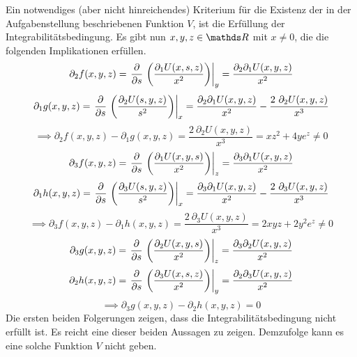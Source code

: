 \begin{atiSolution}
\begin{atiSubtaskSolutions}
{\[      \]
      Ein notwendiges (aber nicht hinreichendes) Kriterium für die Existenz der in der Aufgabenstellung beschriebenen Funktion $V$, ist die Erfüllung der Integrabilitätsbedingung.
      Es gibt nun $x,y,z\in\setReal$ mit $x\neq 0$, die die folgenden Implikationen erfüllen.
      \[
        \partial_2f(x,y,z) = \leibnizPartialDerivativeOperatorValue{s}{\roundBrackets{\frac{\partial_1U(x,s,z)}{x^2}}}{y} = \frac{\partial_2\partial_1U(x,y,z)}{x^2}
      \]
      \[
        \partial_1g(x,y,z) = \leibnizPartialDerivativeOperatorValue{s}{\roundBrackets{\frac{\partial_2U(s,y,z)}{s^2}}}{x} = \frac{\partial_2\partial_1U(x,y,z)}{x^2} - \frac{2\ \partial_2U(x,y,z)}{x^3}
      \]
      \[
        \implies \partial_2f(x,y,z) - \partial_1g(x,y,z) = \frac{2\ \partial_2U(x,y,z)}{x^3} = xz^2 + 4ye^z \neq 0
      \]
      \[
        \partial_3f(x,y,z) = \leibnizPartialDerivativeOperatorValue{s}{\roundBrackets{\frac{\partial_1U(x,y,s)}{x^2}}}{z} = \frac{\partial_3\partial_1U(x,y,z)}{x^2}
      \]
      \[
        \partial_1h(x,y,z) = \leibnizPartialDerivativeOperatorValue{s}{\roundBrackets{\frac{\partial_3U(s,y,z)}{s^2}}}{x} = \frac{\partial_3\partial_1U(x,y,z)}{x^2} - \frac{2\ \partial_3U(x,y,z)}{x^3}
      \]
      \[
        \implies \partial_3f(x,y,z) - \partial_1h(x,y,z) = \frac{2\ \partial_3U(x,y,z)}{x^3} = 2xyz + 2y^2e^z \neq 0
      \]
      \[
        \partial_3g(x,y,z) = \leibnizPartialDerivativeOperatorValue{s}{\roundBrackets{\frac{\partial_2U(x,y,s)}{x^2}}}{z} = \frac{\partial_3\partial_2U(x,y,z)}{x^2}
      \]
      \[
        \partial_2h(x,y,z) = \leibnizPartialDerivativeOperatorValue{s}{\roundBrackets{\frac{\partial_3U(x,s,z)}{x^2}}}{y} = \frac{\partial_2\partial_3U(x,y,z)}{x^2}
      \]
      \[
        \implies \partial_3g(x,y,z) - \partial_2h(x,y,z) = 0
      \]
      \atiPoints[1]Die ersten beiden Folgerungen zeigen, dass die Integrabilitätsbedingung nicht erfüllt ist.
      Es reicht eine dieser beiden Aussagen zu zeigen.
      \atiPoints[1]Demzufolge kann es eine solche Funktion $V$ nicht geben.
    }
  \end{atiSubtaskSolutions}
\end{atiSolution}